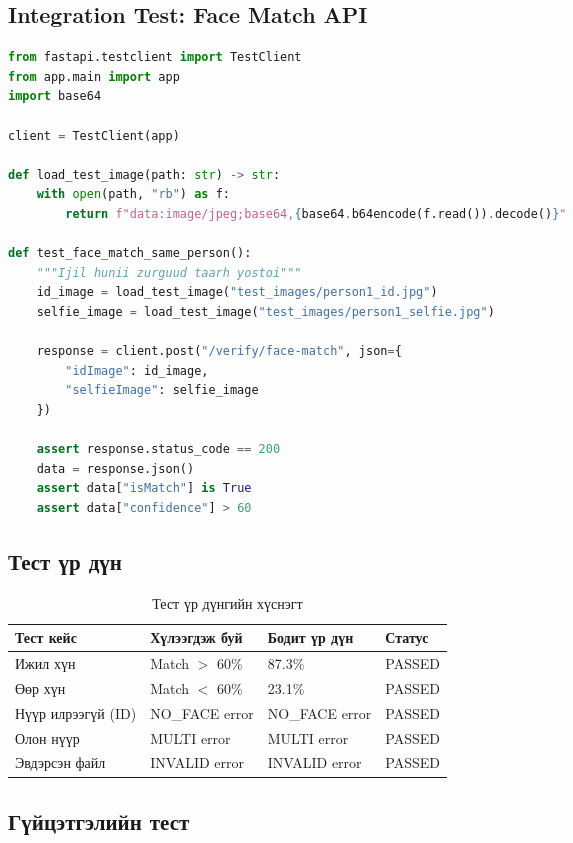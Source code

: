 \documentclass[12pt,a4paper]{article}
\begin{document}
\subsection{Integration Test: Face Match API}

\begin{lstlisting}[language=Python, caption={Integration Test}]
from fastapi.testclient import TestClient
from app.main import app
import base64

client = TestClient(app)

def load_test_image(path: str) -> str:
    with open(path, "rb") as f:
        return f"data:image/jpeg;base64,{base64.b64encode(f.read()).decode()}"

def test_face_match_same_person():
    """Ijil hunii zurguud taarh yostoi"""
    id_image = load_test_image("test_images/person1_id.jpg")
    selfie_image = load_test_image("test_images/person1_selfie.jpg")
    
    response = client.post("/verify/face-match", json={
        "idImage": id_image,
        "selfieImage": selfie_image
    })
    
    assert response.status_code == 200
    data = response.json()
    assert data["isMatch"] is True
    assert data["confidence"] > 60
\end{lstlisting}

\subsection{Тест үр дүн}

\begin{table}[H]
\centering
\begin{tabular}{|p{4cm}|p{3cm}|p{3cm}|p{2.5cm}|}
\hline
\textbf{Тест кейс} & \textbf{Хүлээгдэж буй} & \textbf{Бодит үр дүн} & \textbf{Статус} \\
\hline
Ижил хүн & Match $>$ 60\% & 87.3\% & PASSED \\
\hline
Өөр хүн & Match $<$ 60\% & 23.1\% & PASSED \\
\hline
Нүүр илрээгүй (ID) & NO\_FACE error & NO\_FACE error & PASSED \\
\hline
Олон нүүр & MULTI error & MULTI error & PASSED \\
\hline
Эвдэрсэн файл & INVALID error & INVALID error & PASSED \\
\hline
\end{tabular}
\caption{Тест үр дүнгийн хүснэгт}
\end{table}

\subsection{Гүйцэтгэлийн тест}
\end{document}
